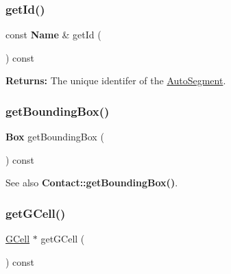 \subsubsection{\texorpdfstring{get\+Id()}{getId()}}
{\footnotesize\ttfamily const \textbf{ Name} \& get\+Id (\begin{DoxyParamCaption}{ }\end{DoxyParamCaption}) const\hspace{0.3cm}{\ttfamily [inline]}}

{\bfseries Returns\+:} The unique {\ttfamily identifer} of the \hyperlink{classKatabatic_1_1AutoSegment}{Auto\+Segment}. \mbox{\label{classKatabatic_1_1AutoContact_ab5d8bf98ab5af6fcfebea1b9f446d5d7}} 
\subsubsection{\texorpdfstring{get\+Bounding\+Box()}{getBoundingBox()}}
{\footnotesize\ttfamily \textbf{ Box} get\+Bounding\+Box (\begin{DoxyParamCaption}{ }\end{DoxyParamCaption}) const\hspace{0.3cm}{\ttfamily [virtual]}}

\begin{DoxySeeAlso}{See also}
\textbf{ Contact\+::get\+Bounding\+Box()}. 
\end{DoxySeeAlso}
\mbox{\label{classKatabatic_1_1AutoContact_a819cf639562a031a1e2e061fe1293d66}} 
\subsubsection{\texorpdfstring{get\+G\+Cell()}{getGCell()}}
{\footnotesize\ttfamily \hyperlink{classKatabatic_1_1GCell}{G\+Cell} $\ast$ get\+G\+Cell (\begin{DoxyParamCaption}{ }\end{DoxyParamCaption}) const\hspace{0.3cm}{\ttfamily [inline]}}

